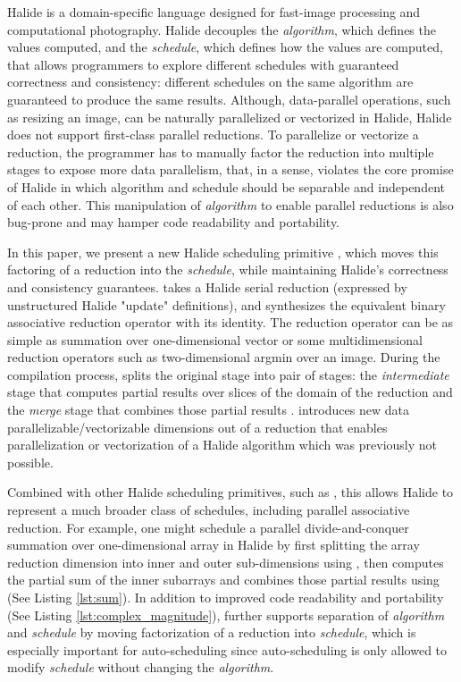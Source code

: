 Halide \cite{Ragan-Kelley:2013:HLC:2491956.2462176} is a domain-specific language designed for fast-image processing and computational photography. Halide decouples the \emph{algorithm}, which defines the values computed, and the \emph{schedule}, which defines how the values are computed, that allows programmers to explore different schedules with guaranteed correctness and consistency: different schedules on the same algorithm are guaranteed to produce the same results. Although, data-parallel operations, such as resizing an image, can be naturally parallelized or vectorized in Halide, Halide does not support first-class parallel reductions. To parallelize or vectorize a reduction, the programmer has to manually factor the reduction into multiple stages to expose more data parallelism, that, in a sense, violates the core promise of Halide in which algorithm and schedule should be separable and independent of each other. This manipulation of \emph{algorithm} to enable parallel reductions is also bug-prone and may hamper code readability and portability.

In this paper, we present a new Halide scheduling primitive , which moves this factoring of a reduction into the \emph{schedule}, while maintaining Halide's correctness and consistency guarantees.  takes a Halide serial reduction (expressed by unstructured Halide "update" definitions), and synthesizes the equivalent binary associative reduction operator with its identity. The reduction operator can be as simple as summation over one-dimensional vector or some multidimensional reduction operators such as two-dimensional argmin over an image. During the compilation process,  splits the original stage into pair of stages: the \emph{intermediate} stage that computes partial results over slices of the domain of the reduction and the \emph{merge} stage that combines those partial results .  introduces new data parallelizable/vectorizable dimensions out of a reduction that enables parallelization or vectorization of a Halide algorithm which was previously not possible. 

Combined with other Halide scheduling primitives, such as , this allows Halide to represent a much broader class of schedules, including parallel associative reduction. For example, one might schedule a parallel divide-and-conquer summation over one-dimensional array in Halide by first splitting the array reduction dimension into inner and outer sub-dimensions using , then computes the partial sum of the inner subarrays and combines those partial results using  (See Listing \ref{lst:sum}). In addition to improved code readability and portability (See Listing \ref{lst:complex_magnitude}),  further supports separation of \emph{algorithm} and \emph{schedule} by moving factorization of a reduction into \emph{schedule}, which is especially important for auto-scheduling \cite{Mullapudi:2016:ASH:2897824.2925952} since auto-scheduling is only allowed to modify \emph{schedule} without changing the \emph{algorithm}.


